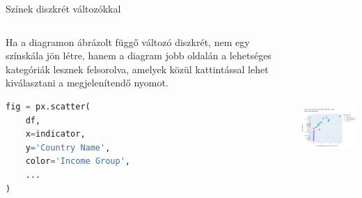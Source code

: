 \documentclass[english, aspectratio=169]{beamer}
\begin{document}
	\begin{frame}[fragile]{Színek diszkrét változókkal}
		\begin{columns}
			\begin{column}{.5\textwidth}
				Ha a diagramon ábrázolt függő változó diszkrét, nem egy színskála jön létre, hanem a diagram jobb oldalán a lehetséges kategóriák lesznek felsorolva, amelyek közül kattintással lehet kiválasztani a megjelenítendő nyomot.\par\medskip
				\begin{lstlisting}[language=python]
fig = px.scatter(
	df,
	x=indicator,
	y='Country Name',
	color='Income Group',
	...
)				
				\end{lstlisting}
			\end{column}
			\begin{column}{.5\textwidth}
				\begin{center}
					\includegraphics[width=7cm, height=7cm, keepaspectratio]{images/scatter_11.png}
				\end{center}
			\end{column}
		\end{columns}
	\end{frame}
	
\end{document}
